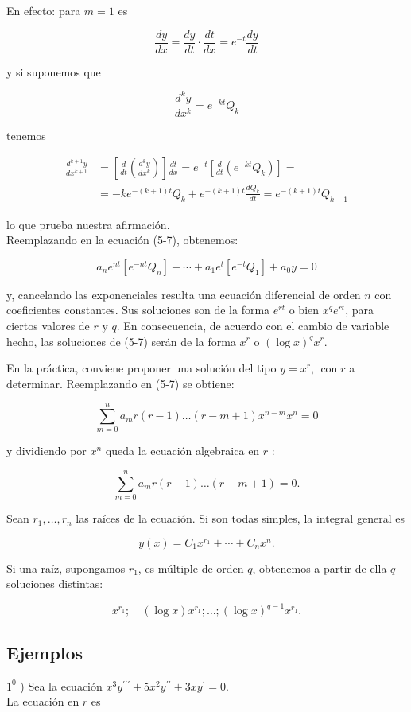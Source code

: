 \documentclass[10pt]{article}
\theoremstyle{plain}
\theoremstyle{definition}
\theoremstyle{remark}
\begin{document}
En efecto: para $m=1$ es

$$
\frac{d y}{d x}=\frac{d y}{d t} \cdot \frac{d t}{d x}=e^{-t} \frac{d y}{d t}
$$

y si suponemos que

$$
\frac{d^{k} y}{d x^{k}}=e^{-k t} Q_{k}
$$

tenemos

$$
\begin{aligned}
\frac{d^{k+1} y}{d x^{k+1}} & =\left[\frac{d}{d t}\left(\frac{d^{k} y}{d x^{k}}\right)\right] \frac{d t}{d x}=e^{-t}\left[\frac{d}{d t}\left(e^{-k t} Q_{k}\right)\right]= \\
& =-k e^{-(k+1) t} Q_{k}+e^{-(k+1) t} \frac{d Q_{k}}{d t}=e^{-(k+1) t} Q_{k+1}
\end{aligned}
$$

lo que prueba nuestra afirmación.\\
Reemplazando en la ecuación (5-7), obtenemos:

$$
a_{n} e^{n t}\left[e^{-n t} Q_{n}\right]+\cdots+a_{1} e^{t}\left[e^{-t} Q_{1}\right]+a_{0} y=0
$$

y, cancelando las exponenciales resulta una ecuación diferencial de orden $n$ con coeficientes constantes. Sus soluciones son de la forma $e^{r t}$ o bien $x^{q} e^{r t}$, para ciertos valores de $r$ y $q$. En consecuencia, de acuerdo con el cambio de variable hecho, las soluciones de (5-7) serán de la forma $x^{r}$ o $(\log x)^{q} x^{r}$.

En la práctica, conviene proponer una solución del tipo $y=x^{r}$, $\operatorname{con} r$ a determinar. Reemplazando en (5-7) se obtiene:

$$
\sum_{m=0}^{n} a_{m} r(r-1) \ldots(r-m+1) x^{n-m} x^{n}=0
$$

y dividiendo por $x^{n}$ queda la ecuación algebraica en $r$ :

$$
\sum_{m=0}^{n} a_{m} r(r-1) \ldots(r-m+1)=0 .
$$

Sean $r_{1}, \ldots, r_{n}$ las raíces de la ecuación. Si son todas simples, la integral general es

$$
y(x)=C_{1} x^{r_{1}}+\cdots+C_{n} x^{n} .
$$


Si una raíz, supongamos $r_{1}$, es múltiple de orden $q$, obtenemos a partir de ella $q$ soluciones distintas:

$$
x^{r_{1}} ; \quad(\log x) x^{r_{1}} ; \ldots ;(\log x)^{q-1} x^{r_{1}} .
$$

\subsection*{Ejemplos}
$1^{0}$ ) Sea la ecuación $x^{3} y^{\prime \prime \prime}+5 x^{2} y^{\prime \prime}+3 x y^{\prime}=0$.\\
La ecuación en $r$ es
\end{document}
